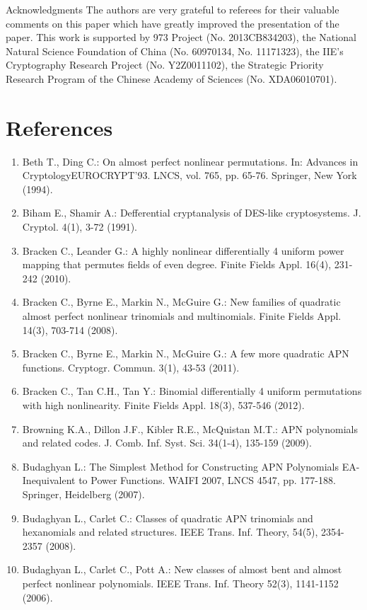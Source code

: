 \documentclass[10pt]{article}
\begin{document}
Acknowledgments The authors are very grateful to referees for their valuable comments on this paper which have greatly improved the presentation of the paper. This work is supported by 973 Project (No. 2013CB834203), the National Natural Science Foundation of China (No. 60970134, No. 11171323), the IIE's Cryptography Research Project (No. Y2Z0011102), the Strategic Priority Research Program of the Chinese Academy of Sciences (No. XDA06010701).

\section*{References}
\begin{enumerate}
  \item Beth T., Ding C.: On almost perfect nonlinear permutations. In: Advances in CryptologyEUROCRYPT'93. LNCS, vol. 765, pp. 65-76. Springer, New York (1994).
  \item Biham E., Shamir A.: Defferential cryptanalysis of DES-like cryptosystems. J. Cryptol. 4(1), 3-72 (1991).
  \item Bracken C., Leander G.: A highly nonlinear differentially 4 uniform power mapping that permutes fields of even degree. Finite Fields Appl. 16(4), 231-242 (2010).
  \item Bracken C., Byrne E., Markin N., McGuire G.: New families of quadratic almost perfect nonlinear trinomials and multinomials. Finite Fields Appl. 14(3), 703-714 (2008).
  \item Bracken C., Byrne E., Markin N., McGuire G.: A few more quadratic APN functions. Cryptogr. Commun. 3(1), 43-53 (2011).
  \item Bracken C., Tan C.H., Tan Y.: Binomial differentially 4 uniform permutations with high nonlinearity. Finite Fields Appl. 18(3), 537-546 (2012).
  \item Browning K.A., Dillon J.F., Kibler R.E., McQuistan M.T.: APN polynomials and related codes. J. Comb. Inf. Syst. Sci. 34(1-4), 135-159 (2009).
  \item Budaghyan L.: The Simplest Method for Constructing APN Polynomials EA-Inequivalent to Power Functions. WAIFI 2007, LNCS 4547, pp. 177-188. Springer, Heidelberg (2007).
  \item Budaghyan L., Carlet C.: Classes of quadratic APN trinomials and hexanomials and related structures. IEEE Trans. Inf. Theory, 54(5), 2354-2357 (2008).
  \item Budaghyan L., Carlet C., Pott A.: New classes of almost bent and almost perfect nonlinear polynomials. IEEE Trans. Inf. Theory 52(3), 1141-1152 (2006).

\end{enumerate}
\end{document}
